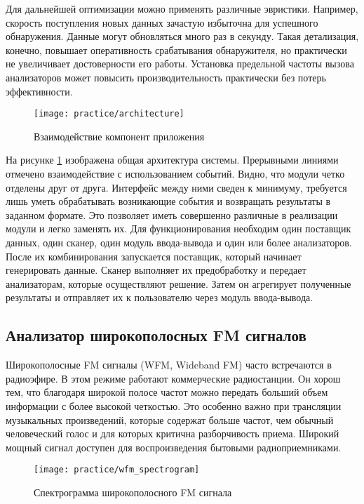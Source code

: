 Для дальнейшей оптимизации можно применять различные эвристики. Например, скорость поступления новых данных зачастую избыточна для успешного обнаружения. Данные могут обновляться много раз в секунду. Такая детализация, конечно, повышает оперативность срабатывания обнаружителя, но практически не увеличивает достоверности его работы. Установка предельной частоты вызова анализаторов может повысить производительность практически без потерь эффективности.

\begin{figure}[h]
  \centering
  \texttt{[image: practice/architecture]}
  \caption{Взаимодействие компонент приложения}
  \label{fig:practice:architecture}
\end{figure}

На рисунке \ref{fig:practice:architecture} изображена общая архитектура системы. Прерывными линиями отмечено взаимодействие с использованием событий. Видно, что модули четко отделены друг от друга. Интерфейс между ними сведен к минимуму, требуется лишь уметь обрабатывать возникающие события и возвращать результаты в заданном формате. Это позволяет иметь совершенно различные в реализации модули и легко заменять их. Для функционирования необходим один поставщик данных, один сканер, один модуль ввода-вывода и один или более анализаторов. После их комбинирования запускается поставщик, который начинает генерировать данные. Сканер выполняет их предобработку и передает анализаторам, которые осуществляют решение. Затем он агрегирует полученные результаты и отправляет их к пользователю через модуль ввода-вывода.


\subsection{Анализатор широкополосных FM сигналов}

Широкополосные FM сигналы (WFM, Wideband FM) часто встречаются в радиоэфире.
В этом режиме работают коммерческие радиостанции.
Он хорош тем, что благодаря широкой полосе частот можно передать больший объем информации с более высокой четкостью. Это особенно важно при трансляции музыкальных произведений, которые содержат больше частот, чем обычный человеческий голос и для которых критична разборчивость приема. Широкий мощный сигнал доступен для воспроизведения бытовыми радиоприемниками.

\begin{figure}[h]
  \centering
  \texttt{[image: practice/wfm\_spectrogram]}
  \caption{Спектрограмма широкополосного FM сигнала}
  \label{fig:practice:wfm_spectrogram}
\end{figure}

